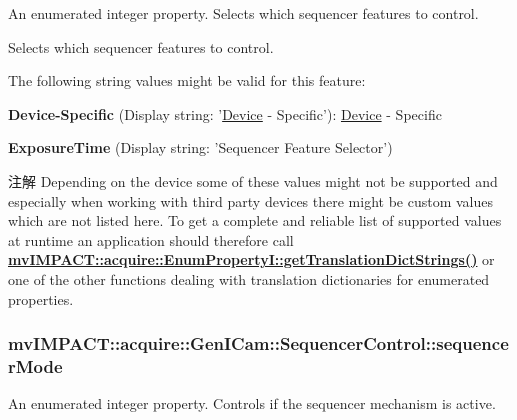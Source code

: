 An enumerated integer property. Selects which sequencer features to control. 

Selects which sequencer features to control.

The following string values might be valid for this feature\+:
\begin{DoxyItemize}
\item {\bfseries Device-\/\+Specific} (Display string\+: '\hyperlink{classmv_i_m_p_a_c_t_1_1acquire_1_1_device}{Device} -\/ Specific')\+: \hyperlink{classmv_i_m_p_a_c_t_1_1acquire_1_1_device}{Device} -\/ Specific
\item {\bfseries Exposure\+Time} (Display string\+: 'Sequencer Feature Selector')
\end{DoxyItemize}

\begin{DoxyNote}{注解}
Depending on the device some of these values might not be supported and especially when working with third party devices there might be custom values which are not listed here. To get a complete and reliable list of supported values at runtime an application should therefore call {\bfseries \hyperlink{classmv_i_m_p_a_c_t_1_1acquire_1_1_enum_property_i_a0ba6ccbf5ee69784d5d0b537924d26b6}{mv\+I\+M\+P\+A\+C\+T\+::acquire\+::\+Enum\+Property\+I\+::get\+Translation\+Dict\+Strings()}} or one of the other functions dealing with translation dictionaries for enumerated properties. 
\end{DoxyNote}
\hypertarget{classmv_i_m_p_a_c_t_1_1acquire_1_1_gen_i_cam_1_1_sequencer_control_a9988c1f6abaf32ace7220c2139bdd5c7}{
\subsubsection[{sequencer\+Mode}]{ mv\+I\+M\+P\+A\+C\+T\+::acquire\+::\+Gen\+I\+Cam\+::\+Sequencer\+Control\+::sequencer\+Mode}}\label{classmv_i_m_p_a_c_t_1_1acquire_1_1_gen_i_cam_1_1_sequencer_control_a9988c1f6abaf32ace7220c2139bdd5c7}


An enumerated integer property. Controls if the sequencer mechanism is active. 

